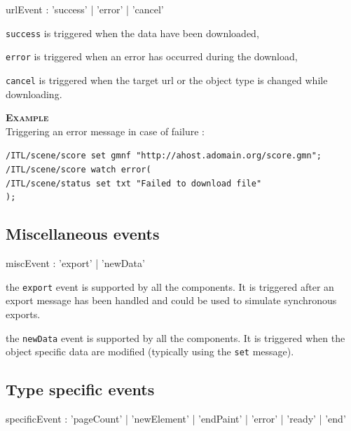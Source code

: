 \documentclass[a4paper,twoside]{report}
\newcommand{\subsublevel}[1]	{\subsection{#1}}
\newcommand{\OSC}[1]		{\texttt{#1}}
\newcommand{\example}		{\textbf{\hspace{-1.5cm}\textbf{\textsc{Example }}}}
\let\olditemize\itemize
\let\oldenditemize\enditemize
\renewenvironment{itemize} 	{\olditemize \setlength{\itemsep}{1mm}}{\oldenditemize}
\newcommand{\sample}	[1]			{\vspace{-2mm}\begin{center}\colorbox{mygrey}{
								\begin{minipage}[t]{0.9\columnwidth} 
								{\small \texttt{#1}}
								\end{minipage}}\end{center}}
\begin{document}
\begin{rail}
urlEvent : 	'success'  
		| 'error'
		| 'cancel'
\end{rail}

\begin{itemize}
\item \OSC{success} is triggered when the data have been downloaded,
\item \OSC{error} is triggered when an error has occurred during the download,
\item \OSC{cancel} is triggered when the target url or the object type is changed while downloading.
\end{itemize}

\example \\
Triggering an error message in case of failure :
\sample{/ITL/scene/score set gmnf "http://ahost.adomain.org/score.gmn";\\
/ITL/scene/score watch error(\\
\hspace*{5mm}/ITL/scene/status set txt "Failed to download file"\\
);
}


\subsublevel{Miscellaneous events}
\label{miscevents}

\begin{rail}
miscEvent : 	  'export'
		| 'newData'
\end{rail}

\begin{itemize}
\item the \OSC{export} event is supported by all the components. It is triggered after an export message has been handled and could be used to simulate synchronous exports.
\item the \OSC{newData} event is supported by all the components. It is triggered when the object specific data are modified (typically using the \OSC{set} message).
\end{itemize}


\subsublevel{Type specific events}
\label{typespecevents}

\begin{rail}
specificEvent : 	  'pageCount'
		| 'newElement'
		| 'endPaint'
		| 'error'
		| 'ready'
		| 'end'
\end{rail}
\end{document}
